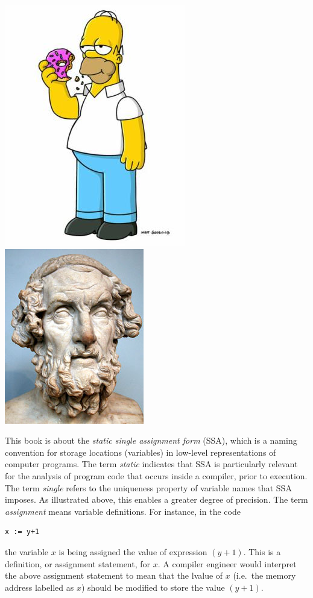 \begin{center}
  \includegraphics[width=.3\textwidth]{homer-simpson}
  \qquad
  \raisebox{2cm}{\Huge $\neq$}
  \qquad
  \includegraphics[width=.3\textwidth]{homer-poet}
\end{center}


This book is about the \textit{static single assignment form} (SSA),
which is a naming convention for storage locations (variables)
in low-level representations
of computer programs.
The term \textit{static} indicates that SSA is particularly
relevant for the analysis of program code that occurs inside a 
compiler, prior to execution.
The term \textit{single} refers to the uniqueness property of
variable names that SSA imposes. As illustrated above, this enables
a greater degree of precision.
The term \textit{assignment} means variable definitions. For
instance, in the code
\begin{verbatim}
x := y+1
\end{verbatim}
the variable $x$ is being assigned the value of expression $(y+1)$.
This is a definition, or assignment statement, for $x$.
A compiler engineer would interpret the above assignment statement
to mean that the lvalue of
$x$ (i.e.\ the memory address labelled as $x$) should be modified to store
the value $(y+1)$.

